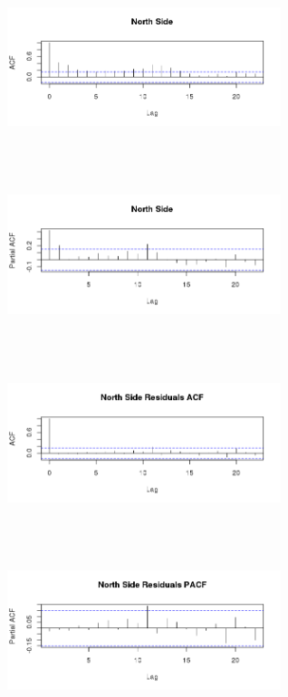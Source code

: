 \documentclass{article} %
\begin{document}
\begin{multicols}{2}
 \begin{figure}[H]
\includegraphics[height=50mm, width=80mm]{Plots/north_ACF.png}
\end{figure}
 
\begin{figure}[H]
\includegraphics[height=50mm, width=80mm]{Plots/North_PACF.png}
\end{figure}
 
\begin{figure}[H]
\includegraphics[height=50mm, width=80mm]{Plots/north_resid_ACF.png}
\end{figure}
 
\begin{figure}[H]
\includegraphics[height=50mm, width=80mm]{Plots/north_resid_PACF.png}
\end{figure}
 \end{multicols}
 
\end{document}
